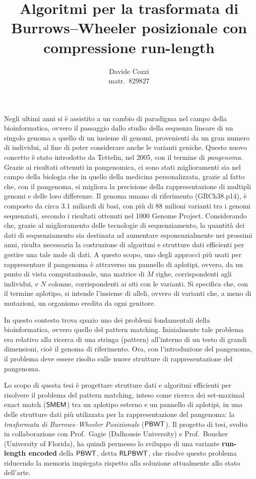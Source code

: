 \documentclass[a4paper,11pt, oneside,italian]{article}
\title{Algoritmi per la trasformata di Burrows--Wheeler
  posizionale con compressione run-length}
\author{Davide Cozzi\\\smaller matr.~829827}
\date{}
\def\PBWT{\mbox{\rm {\sf PBWT}}}
\def\RLPBWT{\mbox{\rm {\sf RLPBWT}}}
\def\SMEM{\mbox{\rm {\sf SMEM}}}
\begin{document}
\maketitle
{}
\noindent
Negli ultimi anni si è assistito a un cambio di paradigma nel campo della
bioinformatica, ovvero il passaggio dallo studio della sequenza lineare di un
singolo genoma a quello di un insieme di genomi, provenienti da un gran numero
di individui, al fine di poter considerare anche le varianti
  geniche. Questo nuovo concetto è stato introdotto da
Tettelin, nel 2005, con il termine di \textit{pangenoma}. Grazie ai risultati
ottenuti in pangenomica, ci sono stati miglioramenti sia nel 
campo della biologia che in quello della medicina personalizzata, grazie al
fatto che, con il pangenoma, si migliora la precisione della rappresentazione di
multipli genomi e delle loro differenze. 
Il genoma umano di riferimento (GRCh38.p14), è composto da circa
3.1 miliardi di basi, con più di 88 milioni 
varianti tra i genomi sequenziati, secondo i risultati ottenuti nel 1000 Genome
Project. Considerando che, grazie al
miglioramento delle tecnologie di sequenziamento, la quantità dei dati di
sequenziamento sia destinata 
ad aumentare esponenzialmente nei prossimi anni, risulta necessaria la
costruzione di algoritmi e   
strutture dati efficienti per gestire una tale mole di dati.
A questo scopo, uno degli approcci più usati per rappresentare il pangenoma è
attraverso un 
pannello di aplotipi, ovvero, da un punto di vista computazionale, una matrice
di $M$ 
righe, corrispondenti agli individui, e $N$ colonne, corrispondenti ai siti con
le varianti. Si specifica che, con il termine
aplotipo, si intende l'insieme di alleli, ovvero di varianti che, a meno di
mutazioni, un organismo eredita da ogni genitore.

In questo contesto trova spazio uno dei problemi fondamentali della
bioinformatica, ovvero quello del pattern matching. Inizialmente tale problema
era relativo alla ricerca di una stringa (pattern) all'interno di un testo di
grandi dimensioni, cioè il genoma di riferimento.
Ora, con l'introduzione del pangenoma, il problema deve essere risolto sulle
nuove strutture 
di rappresentazione del pangenoma.

Lo scopo di questa tesi è progettare strutture dati e algoritmi efficienti per
risolvere il problema del pattern 
matching, inteso come ricerca dei set-maximal exact match ($\SMEM$) tra un
aplotipo 
esterno e un pannello di aplotipi, in una delle 
strutture dati più utilizzata per la rappresentazione del pangenoma: la
\textit{trasformata di Burrows--Wheeler 
  Posizionale} ($\PBWT$). Il progetto di tesi, svolto in collaborazione con
Prof.~Gagie (Dalhousie University) e Prof.~Boucher 
(University of Florida), ha quindi permesso lo sviluppo di una variante
\textbf{run-length encoded} della $\PBWT$, detta $\RLPBWT$, che
risolve questo problema riducendo la memoria impiegata rispetto
alla soluzione attualmente allo stato dell'arte.
\end{document}
